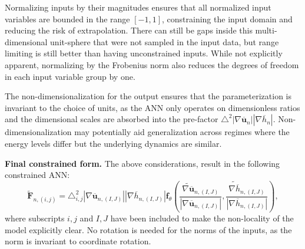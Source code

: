 \documentclass[draft]{agujournal2019}
\begin{document}
Normalizing inputs by their magnitudes ensures that all normalized input variables are bounded in the range $[-1, 1]$, constraining the input domain and reducing the risk of extrapolation. There can still be gaps inside this multi-dimensional unit-sphere that were not sampled in the input data, but range limiting is still better than having unconstrained inputs. 
While not explicitly apparent, normalizing by the Frobenius norm also reduces the degrees of freedom in each input variable group by one.

The non-dimensionalization for the output ensures that the parameterization is invariant to the choice of units, as the ANN only operates on dimensionless ratios and the dimensional scales are absorbed into the pre-factor $\triangle^2 |\nabla \overline{\mathbf{u}}_n| |\nabla \overline{h}_n|$.
Non-dimensionalization may potentially aid generalization across regimes where the energy levels differ but the underlying dynamics are similar.




\textbf{Final constrained form.} The above considerations, result in the following constrained ANN: 
\begin{equation}
    \mathbf{\widetilde{F}}_{n, (i,j)} = 
    \triangle_{i,j}^2  
    |\nabla \overline{\mathbf{u}}_{n, (I, J)}| 
    |\nabla \overline{h}_{n, (I, J)}|
    \mathbf{f}_\theta\left(
    \frac{\widetilde{\nabla \overline{\mathbf{u}}}_{n, (I, J)}}{|\nabla \overline{\mathbf{u}}_{n, (I, J)}|},
    \frac{\widetilde{\nabla \overline{h}}_{n, (I, J)}}{|\nabla \overline{h}_{n, (I, J)}|} \right),
    \label{eqn:final_functional_form}
\end{equation}
where subscripts $i,j$ and $I,J$ have been included to make the non-locality of the model explicitly clear. 
No rotation is needed for the norms of the inputs, as the norm is invariant to coordinate rotation.
\end{document}
